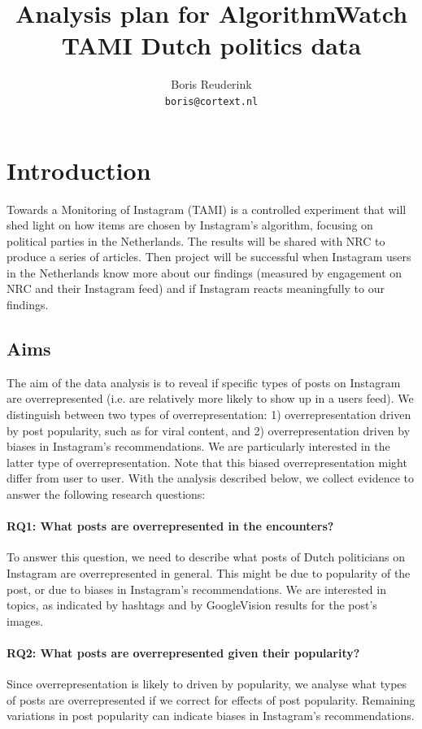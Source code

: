 \documentclass[a4paper]{article}
\author{Boris Reuderink\\\texttt{boris@cortext.nl}}
\title{Analysis plan for AlgorithmWatch TAMI Dutch politics data}
\begin{document}
\maketitle
\tableofcontents
\section{Introduction}
Towards a Monitoring of Instagram (TAMI) is a controlled experiment that will
shed light on how items are chosen by Instagram's algorithm, focusing on
political parties in the Netherlands. The results will be shared with NRC to
produce a series of articles. Then project will be successful when Instagram
users in the Netherlands know more about our findings (measured by engagement
on NRC and their Instagram feed) and if Instagram reacts meaningfully to our
findings.

\subsection{Aims}
The aim of the data analysis is to reveal if specific types of posts on
Instagram are overrepresented (i.e. are relatively more likely to show up in
a users feed). We distinguish between two types of overrepresentation: 1)
overrepresentation driven by post popularity, such as for viral content, and
2) overrepresentation driven by biases in Instagram’s recommendations. We are
particularly interested in the latter type of overrepresentation. Note that
this biased overrepresentation might differ from user to user. With the
analysis described below, we collect evidence to answer the following
research questions:

\label{sec:RQ}
\paragraph{RQ1: What posts are overrepresented in the encounters?}
To answer this question, we need to describe what posts of Dutch politicians on
Instagram are overrepresented in general. This might be due to popularity of
the post, or due to biases in Instagram’s recommendations. We are interested
in topics, as indicated by hashtags and by GoogleVision results for the
post's images.

\paragraph{RQ2: What posts are overrepresented given their
popularity?} Since overrepresentation is likely to driven by popularity, we
analyse what types of posts are overrepresented if we correct for effects of
post popularity. Remaining variations in post popularity can indicate biases
in Instagram’s recommendations.
\end{document}
